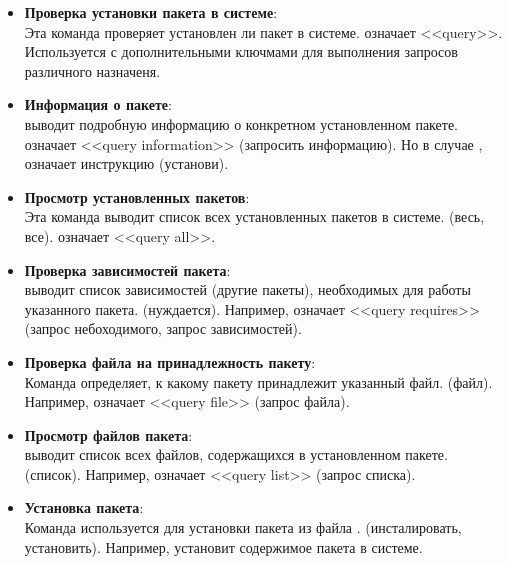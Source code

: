 \begin{itemize}
	\item \textbf{Проверка установки пакета в системе}: \\
	Эта команда проверяет установлен ли пакет в системе.  означает <<query>>.
	Используется с дополнительными ключмами для выполнения запросов различного назначеня.

	\item \textbf{Информация о пакете}: \\
	 выводит подробную информацию о конкретном установленном пакете.  означает <<query information>>
	(запросить информацию). Но в случае ,  означает инструкцию  (установи).

	\item \textbf{Просмотр установленных пакетов}: \\
	Эта команда выводит список всех установленных пакетов в системе.  (весь, все).  означает <<query all>>.

	\item \textbf{Проверка зависимостей пакета}: \\
	  выводит список зависимостей (другие пакеты), необходимых для работы указанного пакета. 
	(нуждается). Например,  означает <<query requires>> (запрос небоходимого, запрос зависимостей).

	\item \textbf{Проверка файла на принадлежность пакету}: \\
	Команда  определяет, к какому пакету принадлежит указанный файл. 
	(файл). Например,  означает <<query file>> (запрос файла).

	\item \textbf{Просмотр файлов пакета}: \\
	  выводит список всех файлов, содержащихся в установленном пакете. 
	(список). Например,  означает <<query list>> (запрос списка).

	\item \textbf{Установка пакета}: \\
	Команда  используется для установки пакета из файла . 
	(инсталировать, установить). Например,  установит содержимое пакета в системе.


\end{itemize}
